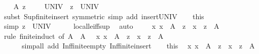 \begin{isabellebody}
\isamarkupfalse%
\isanewline
\ \ \isamarkupfalse%
\ A\ z\isanewline
\ \ \isamarkupfalse%
\ {\isachardoublequoteopen}{\isasymSqunion}\ UNIV\ {\isacharequal}{\kern0pt}\ z\ {\isasymsqunion}\ {\isasymSqunion}UNIV{\isachardoublequoteclose}\isanewline
\ \ \ \ \isamarkupfalse%
\ {\isacharparenleft}{\kern0pt}subst\ Sup{\isacharunderscore}{\kern0pt}finite{\isacharunderscore}{\kern0pt}insert\ {\isacharbrackleft}{\kern0pt}symmetric{\isacharbrackright}{\kern0pt}{\isacharcomma}{\kern0pt}\ simp\ add{\isacharcolon}{\kern0pt}\ insert{\isacharunderscore}{\kern0pt}UNIV{\isacharparenright}{\kern0pt}\isanewline
\ \ \isamarkupfalse%
\ this\ \isamarkupfalse%
\ {\isacharbrackleft}{\kern0pt}simp{\isacharbrackright}{\kern0pt}{\isacharcolon}{\kern0pt}\ {\isachardoublequoteopen}z\ {\isasymle}\ {\isasymSqunion}UNIV{\isachardoublequoteclose}\isanewline
\ \ \ \ \isamarkupfalse%
\ local{\isachardot}{\kern0pt}le{\isacharunderscore}{\kern0pt}iff{\isacharunderscore}{\kern0pt}sup\ \isamarkupfalse%
\ auto\isanewline
\ \ \isamarkupfalse%
\ {\isachardoublequoteopen}{\isacharparenleft}{\kern0pt}{\isasymforall}\ x{\isachardot}{\kern0pt}\ x\ {\isasymin}\ A\ {\isasymlongrightarrow}\ z\ {\isasymle}\ x{\isacharparenright}{\kern0pt}\ {\isasymlongrightarrow}\ z\ {\isasymle}\ {\isasymSqinter}A{\isachardoublequoteclose}\isanewline
\ \ \ \ \isamarkupfalse%
\ {\isacharparenleft}{\kern0pt}rule\ finite{\isacharunderscore}{\kern0pt}induct\ {\isacharbrackleft}{\kern0pt}of\ A\ {\isachardoublequoteopen}{\isasymlambda}\ A\ {\isachardot}{\kern0pt}\ {\isacharparenleft}{\kern0pt}{\isasymforall}\ x{\isachardot}{\kern0pt}\ x\ {\isasymin}\ A\ {\isasymlongrightarrow}\ z\ {\isasymle}\ x{\isacharparenright}{\kern0pt}\ {\isasymlongrightarrow}\ z\ {\isasymle}\ {\isasymSqinter}A{\isachardoublequoteclose}{\isacharbrackright}{\kern0pt}{\isacharparenright}{\kern0pt}\isanewline
\ \ \ \ \ \ {\isacharparenleft}{\kern0pt}simp{\isacharunderscore}{\kern0pt}all\ add{\isacharcolon}{\kern0pt}\ Inf{\isacharunderscore}{\kern0pt}finite{\isacharunderscore}{\kern0pt}empty\ Inf{\isacharunderscore}{\kern0pt}finite{\isacharunderscore}{\kern0pt}insert{\isacharparenright}{\kern0pt}\isanewline
\ \ \isamarkupfalse%
\ this\ \isamarkupfalse%
\ {\isachardoublequoteopen}{\isacharparenleft}{\kern0pt}{\isasymAnd}x{\isachardot}{\kern0pt}\ x\ {\isasymin}\ A\ {\isasymLongrightarrow}\ z\ {\isasymle}\ x{\isacharparenright}{\kern0pt}\ {\isasymLongrightarrow}\ z\ {\isasymle}\ {\isasymSqinter}A{\isachardoublequoteclose}\isanewline

\end{isabellebody}
